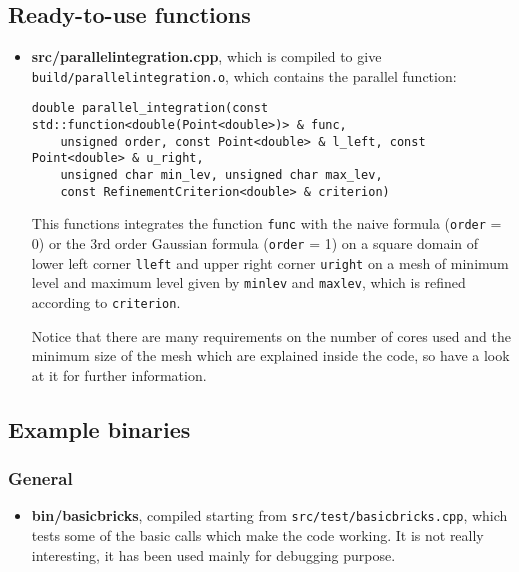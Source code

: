 \documentclass[a4paper,10pt]{article}
\begin{document}
\subsection{Ready-to-use functions}\label{foo1}
\begin{itemize}
 \item \textbf{src/parallel\textunderscore integration.cpp}, which is compiled to give \texttt{build/parallel\textunderscore integration.o}, which contains the parallel function:
 \begin{center}
  \begin{verbatim}
double parallel_integration(const std::function<double(Point<double>)> & func, 
    unsigned order, const Point<double> & l_left, const Point<double> & u_right, 
    unsigned char min_lev, unsigned char max_lev, 
    const RefinementCriterion<double> & criterion)   
  \end{verbatim}
 \end{center}
This functions integrates the function \texttt{func} with the naive formula (\texttt{order} = 0) or the 3rd order Gaussian formula (\texttt{order} = 1) on a square domain of lower left corner \texttt{l\textunderscore left} and upper right corner  \texttt{u\textunderscore right} on a mesh of minimum level and maximum level given by \texttt{min\textunderscore lev} and \texttt{max\textunderscore lev}, which is refined according to \texttt{criterion}.

Notice that there are many requirements on the number of cores used and the minimum size of the mesh which are explained inside the code, so have a look at it for further information.
\end{itemize}

\subsection{Example binaries}
\subsubsection{General}
\begin{itemize}
 \item \textbf{bin/basic\textunderscore bricks}, compiled starting from \texttt{src/test/basic\textunderscore bricks.cpp}, which tests some of the basic calls which make the code working. It is not really interesting, it has been used mainly for debugging purpose.
 \end{itemize}
\end{document}
